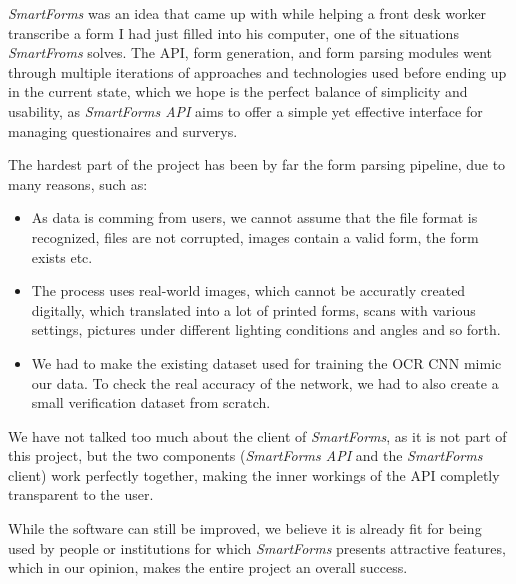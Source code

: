 \documentclass[11pt, a4paper]{report}
\begin{document}
\textit{SmartForms} was an idea that came up with while helping a front desk worker transcribe a form I had just filled into his computer, one of the situations \textit{SmartFroms} solves. The API, form generation, and form parsing modules went through multiple iterations of approaches and technologies used before ending up in the current state, which we hope is the perfect balance of simplicity and usability, as \textit{SmartForms API} aims to offer a simple yet effective interface for managing questionaires and surverys.

The hardest part of the project has been by far the form parsing pipeline, due to many reasons, such as:
\begin{itemize}
	\item As data is comming from users, we cannot assume that the file format is recognized, files are not corrupted, images contain a valid form, the form exists etc.
	\item The process uses real-world images, which cannot be accuratly created digitally, which translated into a lot of printed forms, scans with various settings, pictures under different lighting conditions and angles and so forth.
	\item We had to make the existing dataset used for training the OCR CNN mimic our data. To check the real accuracy of the network, we had to also create a small verification dataset from scratch.
\end{itemize}

We have not talked too much about the client of \textit{SmartForms}, as it is not part of this project, but the two components (\textit{SmartForms API} and the \textit{SmartForms} client) work perfectly together, making the inner workings of the API completly transparent to the user.


While the software can still be improved, we believe it is already fit for being used by people or institutions for which \textit{SmartForms} presents attractive features, which in our opinion, makes the entire project an overall success.
\end{document}

